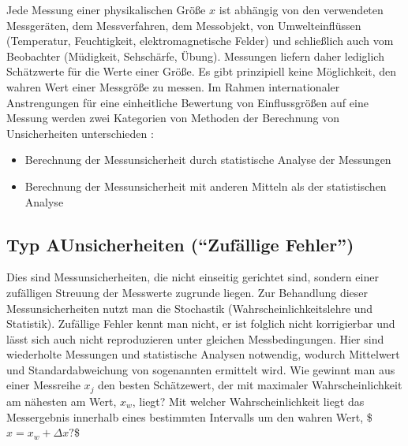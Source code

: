 \documentclass[letterpaper,10pt,english]{jupyterBook}
\begin{document}
\sphinxAtStartPar
Jede Messung einer physikalischen Größe \(x\) ist abhängig von den verwendeten Messgeräten, dem Messverfahren, dem Messobjekt, von Umwelteinflüssen (Temperatur, Feuchtigkeit, elektromagnetische Felder) und schließlich auch vom Beobachter (Müdigkeit, Sehschärfe, Übung). Messungen liefern daher lediglich Schätzwerte für die  Werte einer Größe. Es gibt prinzipiell keine Möglichkeit, den wahren Wert einer Messgröße zu messen. Im Rahmen internationaler Anstrengungen für eine einheitliche Bewertung von Einflussgrößen auf eine Messung werden zwei Kategorien von Methoden der Berechnung von Unsicherheiten unterschieden :
\begin{itemize}
\item {} 
\sphinxAtStartPar
{} Berechnung der Messunsicherheit durch statistische Analyse der Messungen

\item {} 
\sphinxAtStartPar
{} Berechnung der Messunsicherheit mit anderen Mitteln als der statistischen Analyse

\end{itemize}

\sphinxAtStartPar
{}


\subsection{Typ A\sphinxhyphen{}Unsicherheiten (“Zufällige Fehler”)}
\label{\detokenize{content/1_Messunsicherheiten:typ-a-unsicherheiten-zufallige-fehler}}
\sphinxAtStartPar
Dies sind Messunsicherheiten, die nicht einseitig gerichtet sind, sondern einer zufälligen Streuung der Messwerte zugrunde liegen. Zur Behandlung dieser Messunsicherheiten nutzt man die Stochastik (Wahrscheinlichkeitslehre und Statistik).
Zufällige Fehler kennt man nicht, er ist folglich nicht korrigierbar und lässt sich auch nicht reproduzieren unter gleichen Messbedingungen. Hier sind wiederholte Messungen und statistische Analysen notwendig, wodurch Mittelwert und Standardabweichung von sogenannten  ermittelt wird. Wie gewinnt man aus einer Messreihe \(x_j\) den besten Schätzewert, der mit maximaler Wahrscheinlichkeit am nähesten am  Wert, \(x_w\), liegt? Mit welcher Wahrscheinlichkeit liegt das Messergebnis innerhalb eines bestimmten Intervalls um den wahren Wert, \$\(x = x_w + \Delta x ?\)\$
\end{document}
